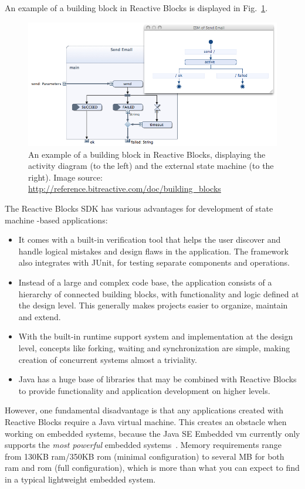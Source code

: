 An example of a building block in Reactive Blocks is displayed in Fig.~\ref{figure:reactive_blocks}.

\begin{figure}[h]
	\centering
	\includegraphics[scale=0.5]{img/reactive_blocks.png}
	\caption[A building block in Reactive Blocks]{An example of a building block in Reactive Blocks, displaying the activity diagram (to the left) and the external state machine (to the right). Image source: \url{http://reference.bitreactive.com/doc/building_blocks} \label{figure:reactive_blocks} }
\end{figure}

The Reactive Blocks SDK has various advantages for development of state machine -based applications:
\begin{itemize}
	\item It comes with a built-in verification tool that helps the user discover and handle logical mistakes and design flaws in the application. The framework also integrates with JUnit, for testing separate components and operations.
	\item Instead of a large and complex code base, the application consists of a hierarchy of connected building blocks, with functionality and logic defined at the design level. This generally makes projects easier to organize, maintain and extend.
	\item With the built-in runtime support system and implementation at the design level, concepts like forking, waiting and synchronization are simple, making creation of concurrent systems almost a triviality.
	\item Java has a huge base of libraries that may be combined with Reactive Blocks to provide functionality and application development on higher levels.
\end{itemize}

However, one fundamental disadvantage is that any applications created with Reactive Blocks require a Java virtual machine. This creates an obstacle when working on embedded systems, because the Java SE Embedded \gls{vm} currently only supports the \emph{most powerful} embedded systems~\cite{website:java_embedded_vm}. Memory requirements range from 130KB \gls{ram}/350KB \gls{rom} (minimal configuration) to several MB for both \gls{ram} and \gls{rom} (full configuration), which is more than what you can expect to find in a typical lightweight embedded system.

